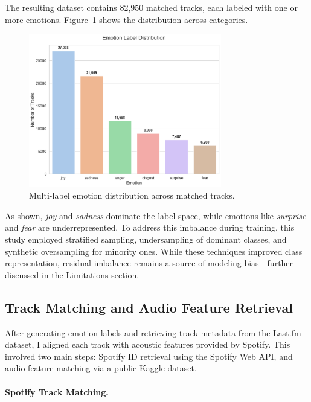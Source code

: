 \documentclass{article}
\begin{document}
The resulting dataset contains 82,950 matched tracks, each labeled with one or more emotions. Figure~\ref{fig:emotion_dist} shows the distribution across categories.

\begin{figure}[H]
\centering
\includegraphics[width=0.75\textwidth]{Graphics/Emotion Distribution.pdf}
\caption{Multi-label emotion distribution across matched tracks.}
\label{fig:emotion_dist}
\end{figure}

As shown, \textit{joy} and \textit{sadness} dominate the label space, while emotions like \textit{surprise} and \textit{fear} are underrepresented. To address this imbalance during training, this study employed stratified sampling, undersampling of dominant classes, and synthetic oversampling for minority ones. While these techniques improved class representation, residual imbalance remains a source of modeling bias—further discussed in the Limitations section.


\subsection{Track Matching and Audio Feature Retrieval}

After generating emotion labels and retrieving track metadata from the Last.fm dataset, I aligned each track with acoustic features provided by Spotify. This involved two main steps: Spotify ID retrieval using the Spotify Web API, and audio feature matching via a public Kaggle dataset. 

\paragraph{Spotify Track Matching.}
\end{document}
